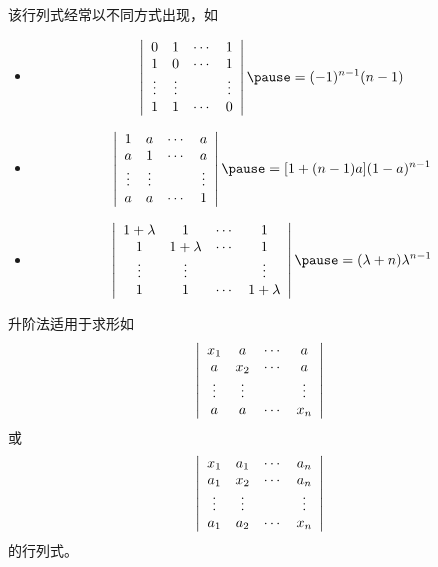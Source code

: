 \begin{frame}
    该行列式经常以不同方式出现，如
    \begin{itemize}
    \item
      $$
      \left|
      \begin{array}{cccc}
        0  &  1  & \cd & 1   \\
        1  &  0  & \cd & 1   \\
        \vd& \vd &     & \vd \\
        1  &  1  & \cd & 0 
      \end{array}
      \right| \pause  = (-1)^{n-1}(n-1)
      $$ \pause 
    \item
      $$
      \left|
      \begin{array}{cccc}
        1  &  a  & \cd & a   \\
        a  &  1  & \cd & a   \\
        \vd& \vd &     & \vd \\
        a  &  a  & \cd & 1
      \end{array}
      \right| \pause
      = [1+(n-1)a](1-a)^{n-1}
      $$ \pause
    \item
      $$
      \left|
      \begin{array}{cccc}
        1+\lambda  &  1  & \cd & 1   \\
        1  &  1+\lambda  & \cd & 1   \\
        \vd& \vd &     & \vd \\
        1  &  1  & \cd & 1+\lambda 
      \end{array}
      \right| \pause
      = (\lambda+n)\lambda^{n-1}
      $$
    \end{itemize}

  
\end{frame}


\begin{frame}
    升阶法适用于求形如
    $$
    \left|
    \begin{array}{cccc}
      x_1 &  a  & \cdots & a   \\
      a   & x_2 & \cdots & a   \\
      \vdots & \vdots &     & \vdots \\
      a   &  a  & \cdots & x_n
    \end{array}
    \right|
    $$
    或
    $$
    \left|
    \begin{array}{cccc}
      x_1 & a_1  & \cdots & a_n   \\
      a_1 & x_2 & \cdots  & a_n   \\
      \vdots & \vdots &     & \vdots \\
      a_1 & a_2  & \cdots & x_n
    \end{array}
    \right|
    $$      
    的行列式。
\end{frame}


